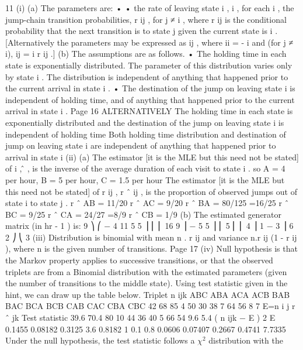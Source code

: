 \documentclass[a4paper,12pt]{article}
\begin{document}
\begin{enumerate}
11
(i)
(a)
The parameters are:
•
•
the rate of leaving state i , \lambda i , for each i ,
the jump-chain transition probabilities, r ij , for j ≠ i , where r ij is the
conditional probability that the next transition is to state j given the
current state is i .
[Alternatively the parameters may be expressed as \sigma  ij , where \sigma  ii = - \lambda i
and (for j ≠ i), \sigma  ij = \lambda i r ij .]
(b)
The assumptions are as follows.
• The holding time in each state is exponentially distributed. The
parameter of this distribution varies only by state i . The
distribution is independent of anything that happened prior to the
current arrival in state i .
• The destination of the jump on leaving state i is independent of
holding time, and of anything that happened prior to the current
arrival in state i .
Page 16%
ALTERNATIVELY
The holding time in each state is exponentially distributed and the
destination of the jump on leaving state i is independent of holding
time
Both holding time distribution and destination of jump on leaving state
i are independent of anything that happened prior to arrival in state i
(ii)
(a)
The estimator [it is the MLE but this need not
be stated] of \lambda i , \lambdâ , is the inverse of the average duration of each visit
to state i .
so \hat{\lambda} A = 4 per hour, \hat{\lambda} B = 5 per hour, \hat{\lambda} C = 1.5 per hour
The estimator [it is the MLE but this need not be stated] of r ij , r ˆ ij , is
the proportion of observed jumps out of state i to state j .
r ˆ AB = 11/20
r ˆ AC = 9/20
r ˆ BA = 80/125 =16/25
r ˆ BC = 9/25
r ˆ CA = 24/27 =8/9
r ˆ CB = 1/9
(b)
The estimated generator matrix (in hr - 1 ) is:
9 ⎞
⎛ − 4 11
5
5 ⎟
⎜
⎜ 16
9 ⎟
− 5
5 ⎟
⎜ 5
⎜ ⎜ 4
⎟
1
− 3 ⎟
6
2 ⎠
⎝ 3
(iii)
Distribution is binomial with mean n . r ij and variance n.r ij
(1 - r ij ), where n is the given number of transitions.
Page 17%
(iv)
Null hypothesis is that the Markov property applies to successive transitions,
or that the observed triplets are from a Binomial distribution with the
estimated parameters (given the number of transitions to the middle state).
Using test statistic given in the hint, we can draw up the table below.
Triplet n ijk
ABC
ABA
ACA
ACB
BAB
BAC
BCA
BCB
CAB
CAC
CBA
CBC 42
68
85
4
50
30
38
7
64
56
8
7
E=n i j r ˆ jk
Test statistic
39.6
70.4
80
10
44
36
40
5
66
54
9.6
5.4
( n ijk − E ) 2
E
0.1455
0.08182
0.3125
3.6
0.8182
1
0.1
0.8
0.0606
0.07407
0.2667
0.4741
7.7335
Under the null hypothesis, the test statistic follows a $\chi^2$ distribution with the

\end{enumerate}
\end{document}
